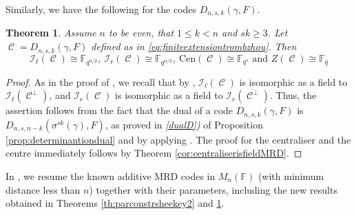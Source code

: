 \documentclass[a4paper, 11pt]{article}
\DeclareMathOperator{\C}{\mathcal{C}}
\newtheorem{theorem}{Theorem}[section]
\newcommand{\F}{{\mathbb F}}
\newcommand{\lid}{\mathcal{I}_{\ell}}
\newcommand{\rid}{\mathcal{I}_{r}}
\newcommand{\cen}{\mathrm{Cen}}
\begin{document}
Similarly, we have the following for the codes $D_{n,s,k}(\gamma,F)$. 

\begin{theorem}\label{th:parametersextensiontrombetti2}
Assume \(n\) to be even, that $1 \leq k < n$ and $sk\geq 3$. Let $\C=D_{n,s,k}(\gamma,F)$ defined as in \eqref{eq:finiteextensiontrombzhou}. Then 
\[
\lid(\C)  \cong \F_{q^{n/2}}, \ \rid(\C) \cong  \F_{q^{n/2}}, \  \cen(\C)  \cong  \F_{q^s} \mbox{ and } Z(\C) \cong  \F_{q}
\]
\end{theorem}

\begin{proof}
As in the proof of , we recall that by \cite[Proposition 4.2]{lunardon2018nuclei}, $\lid(\C)$ is isomorphic as a field to $\lid(\C^{\perp})$, and $\rid(\C)$ is isomorphic as a field to $\rid(\C^{\perp})$. Thus, the assertion follows from the fact that the dual of a code $D_{n,s,k}(\gamma,F)$ is $D_{n,s,n-k}(\sigma^{sk}(\gamma),F)$, as proved in \emph{\ref{dualD})} of Proposition \ref{prop:determinantiondual} and by applying .
The proof for the centraliser and the centre immediately follows by Theorem  \ref{cor:centraliserisfieldMRD}.
\end{proof}


In , we resume the known additive MRD codes in $M_n(\F)$ (with minimum distance less than $n$) together with their parameters, including the new results obtained in Theorems \ref{th:parconstrsheekey2} and \ref{th:parametersextensiontrombetti2}.
\end{document}
